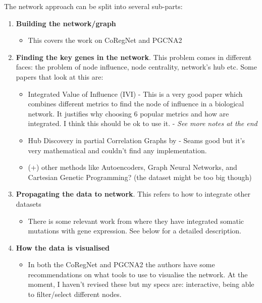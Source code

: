 The network approach can be split into several sub-parts:
\begin{enumerate}
    \item \textbf{Building the network/graph}
    \begin{itemize}
        \item This covers the work on CoRegNet \citet{Nicolle2015-tn} and PGCNA2 \citet{Care2019-ij}
    \end{itemize}
    \item \textbf{Finding the key genes in the network}. This problem comes in different faces: the problem of node influence, node centrality, network's hub etc. Some papers that look at this are:
    \begin{itemize}
        \item Integrated Value of Influence (IVI) \citet{Salavaty2020-wo} - This is a very good paper which combines different metrics to find the node of influence in a biological network. It justifies why choosing 6 popular metrics and how are integrated. I think this should be ok to use it.  - \textit{See more notes at the end}
        \item Hub Discovery in partial Correlation Graphs by \citet{Hero2012-ch} - Seams good but it's very mathematical and couldn't find any implementation.
        \item (+) other methods like Autoencoders, Graph Neural Networks, and Cartesian Genetic Programming? (the dataset might be too big though)
    \end{itemize}
    \item \textbf{Propagating the data to network}. This refers to how to integrate other datasets 
    \begin{itemize}
        \item There is some relevant work from \citet{He2017-dj} where they have integrated somatic mutations with gene expression. See below for a detailed description.
    \end{itemize}
    \item \textbf{How the data is visualised}
    \begin{itemize}
        \item In both the CoRegNet and PGCNA2 the authors have some recommendations on what tools to use to visualise the network. At the moment, I haven't revised these but my specs are: interactive, being able to filter/select different nodes.
    \end{itemize}
\end{enumerate}

